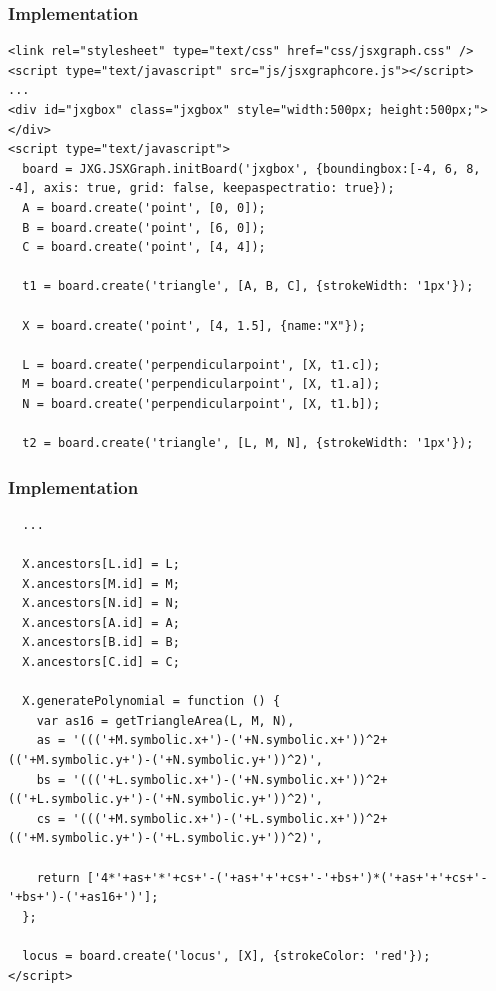 \documentclass{beamer}
\begin{document}
\begin{frame}[fragile]
  \frametitle{Implementation}

  \begin{block}{}
    \begin{lstlisting}
<link rel="stylesheet" type="text/css" href="css/jsxgraph.css" />
<script type="text/javascript" src="js/jsxgraphcore.js"></script>
...
<div id="jxgbox" class="jxgbox" style="width:500px; height:500px;"></div>
<script type="text/javascript">
  board = JXG.JSXGraph.initBoard('jxgbox', {boundingbox:[-4, 6, 8, -4], axis: true, grid: false, keepaspectratio: true});
  A = board.create('point', [0, 0]);
  B = board.create('point', [6, 0]);
  C = board.create('point', [4, 4]);

  t1 = board.create('triangle', [A, B, C], {strokeWidth: '1px'});

  X = board.create('point', [4, 1.5], {name:"X"});

  L = board.create('perpendicularpoint', [X, t1.c]);
  M = board.create('perpendicularpoint', [X, t1.a]);
  N = board.create('perpendicularpoint', [X, t1.b]);

  t2 = board.create('triangle', [L, M, N], {strokeWidth: '1px'});
    \end{lstlisting}
  \end{block}
\end{frame}


\begin{frame}[fragile]
  \frametitle{Implementation}

  \begin{block}{}
    \begin{lstlisting}
  ...

  X.ancestors[L.id] = L;
  X.ancestors[M.id] = M;
  X.ancestors[N.id] = N;
  X.ancestors[A.id] = A;
  X.ancestors[B.id] = B;
  X.ancestors[C.id] = C;

  X.generatePolynomial = function () {
    var as16 = getTriangleArea(L, M, N),
    as = '((('+M.symbolic.x+')-('+N.symbolic.x+'))^2+(('+M.symbolic.y+')-('+N.symbolic.y+'))^2)',
    bs = '((('+L.symbolic.x+')-('+N.symbolic.x+'))^2+(('+L.symbolic.y+')-('+N.symbolic.y+'))^2)',
    cs = '((('+M.symbolic.x+')-('+L.symbolic.x+'))^2+(('+M.symbolic.y+')-('+L.symbolic.y+'))^2)',

    return ['4*'+as+'*'+cs+'-('+as+'+'+cs+'-'+bs+')*('+as+'+'+cs+'-'+bs+')-('+as16+')'];
  };

  locus = board.create('locus', [X], {strokeColor: 'red'});
</script>
    \end{lstlisting}
  \end{block}
\end{frame}
\end{document}
